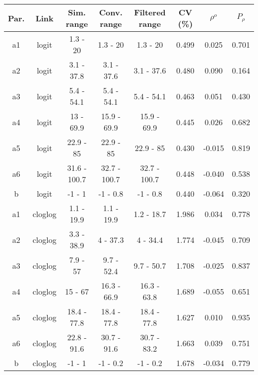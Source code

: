 
\begin{tabular}{cccccccc}
\toprule
Par. & Link & Sim. range & Conv. range & Filtered range & CV (\%) & $\rho^{o}$ & $P_\rho$\\
\midrule
a1 & logit & 1.3 - 20 & 1.3 - 20 & 1.3 - 20 & 0.499 & 0.025 & 0.701\\
a2 & logit & 3.1 - 37.8 & 3.1 - 37.6 & 3.1 - 37.6 & 0.480 & 0.090 & 0.164\\
a3 & logit & 5.4 - 54.1 & 5.4 - 54.1 & 5.4 - 54.1 & 0.463 & 0.051 & 0.430\\
a4 & logit & 13 - 69.9 & 15.9 - 69.9 & 15.9 - 69.9 & 0.445 & 0.026 & 0.682\\
a5 & logit & 22.9 - 85 & 22.9 - 85 & 22.9 - 85 & 0.430 & -0.015 & 0.819\\
a6 & logit & 31.6 - 100.7 & 32.7 - 100.7 & 32.7 - 100.7 & 0.448 & -0.040 & 0.538\\
b & logit & -1 - 1 & -1 - 0.8 & -1 - 0.8 & 0.440 & -0.064 & 0.320\\
\addlinespace
a1 & cloglog & 1.1 - 19.9 & 1.1 - 19.9 & 1.2 - 18.7 & 1.986 & 0.034 & 0.778\\
a2 & cloglog & 3.3 - 38.9 & 4 - 37.3 & 4 - 34.4 & 1.774 & -0.045 & 0.709\\
a3 & cloglog & 7.9 - 57 & 9.7 - 52.4 & 9.7 - 50.7 & 1.708 & -0.025 & 0.837\\
a4 & cloglog & 15 - 67 & 16.3 - 66.9 & 16.3 - 63.8 & 1.689 & -0.055 & 0.651\\
a5 & cloglog & 18.4 - 77.8 & 18.4 - 77.8 & 18.4 - 77.8 & 1.627 & 0.010 & 0.935\\
a6 & cloglog & 22.8 - 91.6 & 30.7 - 91.6 & 30.7 - 83.2 & 1.663 & 0.039 & 0.751\\
b & cloglog & -1 - 1 & -1 - 0.2 & -1 - 0.2 & 1.678 & -0.034 & 0.779\\
\bottomrule
\end{tabular}